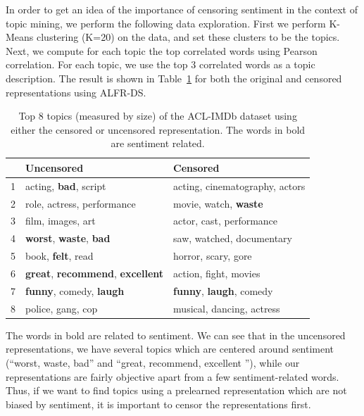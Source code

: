 \documentclass[nohyperref]{article}
\theoremstyle{plain}
\theoremstyle{definition}
\theoremstyle{remark}
\begin{document}
In order to get an idea of the importance of censoring sentiment in the context of topic mining, we perform the following data exploration. First we perform K-Means clustering (K=20) on the data, and set these clusters to be the topics. Next, we compute for each topic the top correlated words using Pearson correlation. For each topic, we use the top 3 correlated words as a topic description. The result is shown in  Table~\ref{imdb_topics} for both the original and censored representations using ALFR-DS.
\begin{table}[t]
\caption{Top 8 topics (measured by size) of the ACL-IMDb dataset using either the censored or uncensored representation. The words in bold are sentiment related.}
\label{imdb_topics}
\vskip 0.15in
\begin{center}
\begin{small}
\addtolength{\tabcolsep}{-4pt}
\begin{tabular}{rll}
\toprule
  &                  Uncensored &                       Censored \\
\midrule
    1 &         acting, \textbf{bad}, script & acting, cinematography, actors \\
    2 &  role, actress, performance &            movie, watch, \textbf{waste} \\
    3 &           film, images, art &       actor, cast, performance \\
    4 &           \textbf{worst}, \textbf{waste}, \textbf{bad} &      saw, watched, documentary \\
    5 &            book, \textbf{felt}, read &            horror, scary, gore \\
    6 & \textbf{great}, \textbf{recommend}, \textbf{excellent} &          action, fight, movies \\
    7 &        \textbf{funny}, comedy, \textbf{laugh} &           \textbf{funny}, \textbf{laugh}, comedy \\
    8 &           police, gang, cop &      musical, dancing, actress \\
\bottomrule
\end{tabular}
\end{small}
\end{center}
\vskip -0.1in
\end{table}
The words in bold are related to sentiment. We can see that in the uncensored representations, we have several topics which are centered around sentiment (``worst, waste, bad'' and ``great, recommend, excellent ''), while our representations are fairly objective apart from a few sentiment-related words. Thus, if we want to find topics using a prelearned representation which are not biased by sentiment, it is important to censor the representations first.
\end{document}
